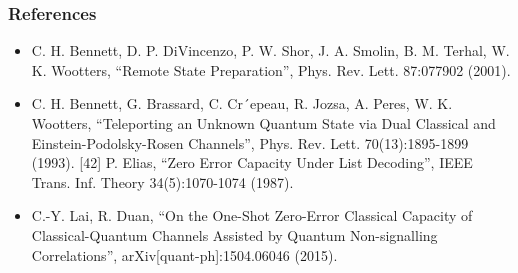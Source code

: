 \documentclass{beamer}
\begin{document}
\begin{frame}
\frametitle{References}

\begin{itemize}
\item C. H. Bennett, D. P. DiVincenzo, P. W. Shor, J. A. Smolin, B. M. Terhal, W. K. Wootters, “Remote State
Preparation”, Phys. Rev. Lett. 87:077902 (2001).
\item C. H. Bennett, G. Brassard, C. Cr´epeau, R. Jozsa, A. Peres, W. K. Wootters, “Teleporting an Unknown Quantum State via Dual Classical and Einstein-Podolsky-Rosen Channels”, Phys. Rev. Lett.
70(13):1895-1899 (1993).
[42] P. Elias, “Zero Error Capacity Under List Decoding”, IEEE Trans. Inf. Theory 34(5):1070-1074 (1987).
\item     C.-Y. Lai, R. Duan, “On the One-Shot Zero-Error Classical Capacity of Classical-Quantum Channels
Assisted by Quantum Non-signalling Correlations”, arXiv[quant-ph]:1504.06046 (2015).

\end{itemize}
\end{frame}
\end{document}
